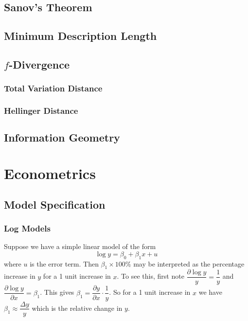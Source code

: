 \documentclass[11pt]{report} %
\begin{document}
\section{Sanov's Theorem}

\section{Minimum Description Length}

\section{$f$-Divergence}

\subsection{Total Variation Distance}

\subsection{Hellinger Distance}

\section{Information Geometry}

\chapter{Econometrics}

\section{Model Specification}

\subsection{Log Models}

Suppose we have a simple linear model of the form
\begin{equation}
\log y = \beta_{0} + \beta_{1}x + u
\end{equation}
where $u$ is the error term. Then $\beta_{1}\times 100\%$ may be interpreted as the percentage increase in $y$ for a 1 unit increase in $x$. To see this, first note $\dfrac{\partial \log y}{y} = \dfrac{1}{y}$ and $\dfrac{\partial \log y}{\partial x} = \beta_{1}$. This gives $\beta_{1} = \dfrac{\partial y}{\partial x}\cdot\dfrac{1}{y}$. So for a 1 unit increase in $x$ we have $\beta_{1} \approx \dfrac{\Delta y}{y}$ which is the relative change in $y$.
\end{document}
